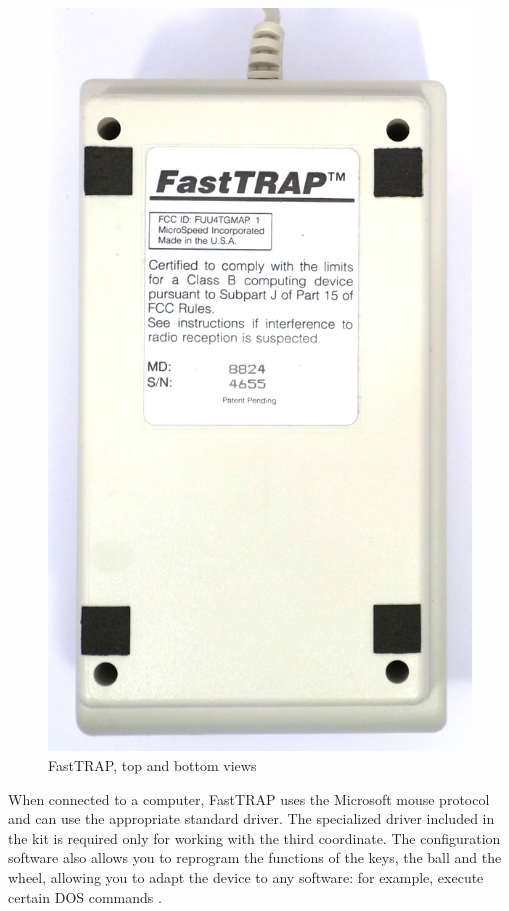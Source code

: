 \documentclass[11pt, a4paper]{article}
\begin{document}
\begin{figure}[h]
    \includegraphics[scale=0.3]{1987_microspeed_fasttrap/bottom_60.jpg}
    \caption{FastTRAP, top and bottom views}
    \label{fig:FastTRAPTop}
\end{figure}

When connected to a computer, FastTRAP uses the Microsoft mouse protocol and can use the appropriate standard driver. The specialized driver included in the kit is required only for working with the third coordinate. The configuration software also allows you to reprogram the functions of the keys, the ball and the wheel, allowing you to adapt the device to any software: for example, execute certain DOS commands  \cite{fast}.
\end{document}
